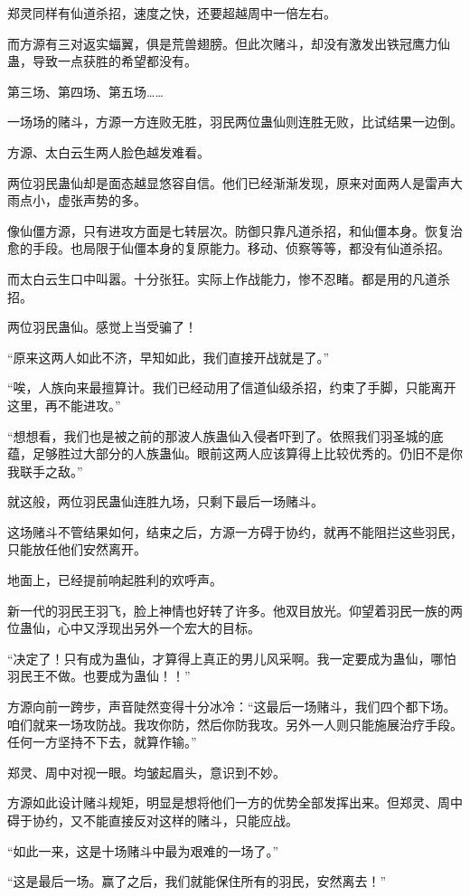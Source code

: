 \begin{this_body}
郑灵同样有仙道杀招，速度之快，还要超越周中一倍左右。

而方源有三对返实蝠翼，俱是荒兽翅膀。但此次赌斗，却没有激发出铁冠鹰力仙蛊，导致一点获胜的希望都没有。

第三场、第四场、第五场……

一场场的赌斗，方源一方连败无胜，羽民两位蛊仙则连胜无败，比试结果一边倒。

方源、太白云生两人脸色越发难看。

两位羽民蛊仙却是面态越显悠容自信。他们已经渐渐发现，原来对面两人是雷声大雨点小，虚张声势的多。

像仙僵方源，只有进攻方面是七转层次。防御只靠凡道杀招，和仙僵本身。恢复治愈的手段。也局限于仙僵本身的复原能力。移动、侦察等等，都没有仙道杀招。

而太白云生口中叫嚣。十分张狂。实际上作战能力，惨不忍睹。都是用的凡道杀招。

两位羽民蛊仙。感觉上当受骗了！

“原来这两人如此不济，早知如此，我们直接开战就是了。”

“唉，人族向来最擅算计。我们已经动用了信道仙级杀招，约束了手脚，只能离开这里，再不能进攻。”

“想想看，我们也是被之前的那波人族蛊仙入侵者吓到了。依照我们羽圣城的底蕴，足够胜过大部分的人族蛊仙。眼前这两人应该算得上比较优秀的。仍旧不是你我联手之敌。”

就这般，两位羽民蛊仙连胜九场，只剩下最后一场赌斗。

这场赌斗不管结果如何，结束之后，方源一方碍于协约，就再不能阻拦这些羽民，只能放任他们安然离开。

地面上，已经提前响起胜利的欢呼声。

新一代的羽民王羽飞，脸上神情也好转了许多。他双目放光。仰望着羽民一族的两位蛊仙，心中又浮现出另外一个宏大的目标。

“决定了！只有成为蛊仙，才算得上真正的男儿风采啊。我一定要成为蛊仙，哪怕羽民王不做。也要成为蛊仙！！”

方源向前一跨步，声音陡然变得十分冰冷：“这最后一场赌斗，我们四个都下场。咱们就来一场攻防战。我攻你防，然后你防我攻。另外一人则只能施展治疗手段。任何一方坚持不下去，就算作输。”

郑灵、周中对视一眼。均皱起眉头，意识到不妙。

方源如此设计赌斗规矩，明显是想将他们一方的优势全部发挥出来。但郑灵、周中碍于协约，又不能直接反对这样的赌斗，只能应战。

“如此一来，这是十场赌斗中最为艰难的一场了。”

“这是最后一场。赢了之后，我们就能保住所有的羽民，安然离去！”


\end{this_body}

